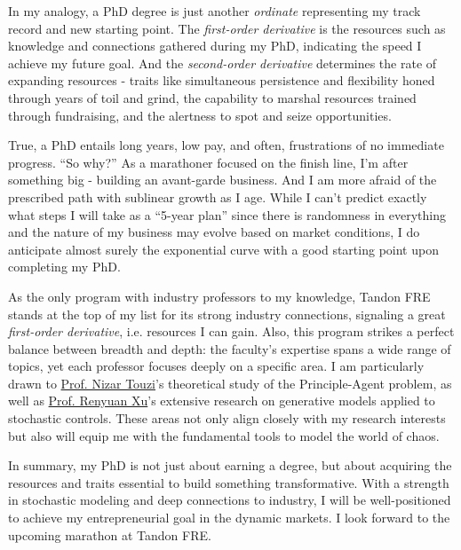 \documentclass[12pt, a4paper]{article}
\newcommand{\NT}{\href{https://engineering.nyu.edu/faculty/nizar-touzi}{Prof. Nizar Touzi}\xspace}
\newcommand{\RX}{\href{https://engineering.nyu.edu/faculty/renyuan-xu}{Prof. Renyuan Xu}\xspace}
\begin{document}
In my analogy, a PhD degree is just another \textit{ordinate} representing my track record and new starting point. The \textit{first-order derivative} is the resources such as knowledge and connections gathered during my PhD, indicating the speed I achieve my future goal. And the \textit{second-order derivative} determines the rate of expanding resources - traits like simultaneous persistence and flexibility honed through years of toil and grind, the capability to marshal resources trained through fundraising, and the alertness to spot and seize opportunities.

True, a PhD entails long years, low pay, and often, frustrations of no immediate progress. “So why?” As a marathoner focused on the finish line, I’m after something big - building an avant-garde business. And I am more afraid of the prescribed path with sublinear growth as I age. While I can’t predict exactly what steps I will take as a “5-year plan” since there is randomness in everything and the nature of my business may evolve based on market conditions, I do anticipate almost surely the exponential curve with a good starting point upon completing my PhD.


As the only program with industry professors to my knowledge, Tandon FRE stands at the top of my list for its strong industry connections, signaling a great \textit{first-order derivative}, i.e. resources I can gain. Also, this program strikes a perfect balance between breadth and depth: the faculty's expertise spans a wide range of topics, yet each professor focuses deeply on a specific area. I am particularly drawn to \NT’s theoretical study of the Principle-Agent problem, as well as \RX's extensive research on generative models applied to stochastic controls. These areas not only align closely with my research interests but also will equip me with the fundamental tools to model the world of chaos.

In summary, my PhD is not just about earning a degree, but about acquiring the resources and traits essential to build something transformative. With a strength in stochastic modeling and deep connections to industry, I will be well-positioned to achieve my entrepreneurial goal in the dynamic markets. I look forward to the upcoming marathon at Tandon FRE.
\end{document}
